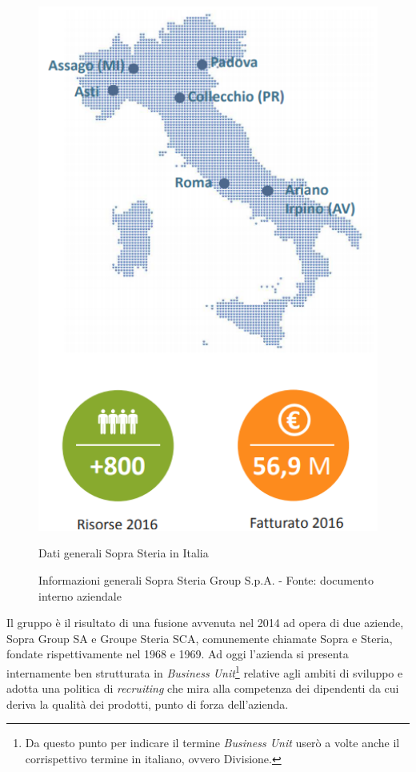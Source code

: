 \begin{figure}[htbp]
\begin{minipage}[c]{.40\textwidth}
\includegraphics[width=1.2\textwidth]{immagini/mappa_italia_fatturato}
\caption{Dati generali Sopra Steria in Italia}
\end{minipage}
\caption{Informazioni generali Sopra Steria Group S.p.A. - Fonte: documento interno aziendale}
\end{figure}


Il gruppo è il risultato di una fusione avvenuta nel 2014 ad opera di due aziende, Sopra Group SA e Groupe Steria SCA, comunemente chiamate Sopra e Steria, fondate rispettivamente nel 1968 e 1969. Ad oggi l'azienda si presenta internamente ben strutturata in \textit{Business Unit}\footnote{Da questo punto per indicare il termine \textit{Business Unit} userò a volte anche il corrispettivo termine in italiano, ovvero Divisione.} relative agli ambiti di sviluppo e adotta una politica di \textit{recruiting} che mira alla competenza dei dipendenti da cui deriva la qualità dei prodotti, punto di forza dell'azienda.\\

